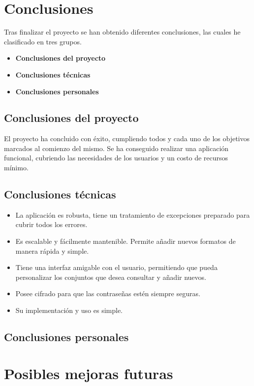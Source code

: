\begin{comment}
Todo proyecto debe incluir las conclusiones que se derivan de su desarrollo. Éstas pueden ser de diferente índole, dependiendo de la tipología del proyecto, pero normalmente van a estar presentes un conjunto de conclusiones relacionadas con los resultados del proyecto y un conjunto de conclusiones técnicas. 
Además, resulta muy útil realizar un informe crítico indicando cómo se puede mejorar el proyecto, o cómo se puede continuar trabajando en la línea del proyecto realizado. 
\end{comment}

\section{Conclusiones}

Tras finalizar el proyecto se han obtenido diferentes conclusiones, las cuales he clasificado en tres grupos.
\begin{itemize}
    \item \textbf{Conclusiones del proyecto}
    \item \textbf{Conclusiones técnicas}
    \item \textbf{Conclusiones personales}
\end{itemize}

\subsection{Conclusiones del proyecto}
El proyecto ha concluido con éxito, cumpliendo todos y cada uno de los objetivos marcados al comienzo del mismo. Se ha conseguido realizar una aplicación funcional, cubriendo las necesidades de los usuarios y un costo de recursos mínimo.

\subsection{Conclusiones técnicas}
\begin{itemize}
    \item La aplicación es robusta, tiene un tratamiento de excepciones preparado para cubrir todos los errores. 
    \item Es escalable y fácilmente mantenible. Permite añadir nuevos formatos de manera rápida y simple.
    \item Tiene una interfaz amigable con el usuario, permitiendo que pueda personalizar los conjuntos que desea consultar y añadir nuevos. 
    \item Posee cifrado para que las contraseñas estén siempre seguras.
    \item Su implementación y uso es simple.
\end{itemize}

\subsection{Conclusiones personales}


\section{Posibles mejoras futuras}